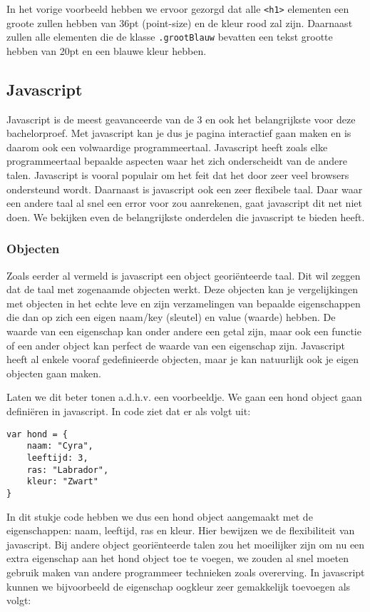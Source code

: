 In het vorige voorbeeld hebben we ervoor gezorgd dat alle \lstinline[basicstyle=\ttfamily\color{red}]|<h1>| elementen een groote zullen hebben van 36pt (point-size) en de kleur rood zal zijn. Daarnaast zullen alle elementen die de klasse \lstinline[basicstyle=\ttfamily\color{red}]|.grootBlauw| bevatten een tekst grootte hebben van 20pt en een blauwe kleur hebben.

\subsection{Javascript}
\label{subsec:Web VR}
Javascript is de meest geavanceerde van de 3 en ook het belangrijkste voor deze bachelorproef. Met javascript kan je dus je pagina interactief gaan maken en is daarom ook een volwaardige programmeertaal. Javascript heeft zoals elke programmeertaal bepaalde aspecten waar het zich onderscheidt van de andere talen. Javascript is vooral populair om het feit dat het door zeer veel browsers ondersteund wordt. Daarnaast is javascript ook een zeer flexibele taal. Daar waar een andere taal al snel een error voor zou aanrekenen, gaat javascript dit net niet doen. We bekijken even de belangrijkste onderdelen die javascript te bieden heeft.

\subsubsection{Objecten}
\label{sssec:objecten}
Zoals eerder al vermeld is javascript een object georiënteerde taal. Dit wil zeggen dat de taal met zogenaamde objecten werkt. Deze objecten kan je vergelijkingen met objecten in het echte leve en zijn verzamelingen van bepaalde eigenschappen die dan op zich een eigen naam/key (sleutel) en value (waarde) hebben. De waarde van een eigenschap kan onder andere een getal zijn, maar ook een functie of een ander object kan perfect de waarde van een eigenschap zijn. Javascript heeft al enkele vooraf gedefinieerde objecten, maar je kan natuurlijk ook je eigen objecten gaan maken.

Laten we dit beter tonen a.d.h.v. een voorbeeldje. We gaan een hond object gaan definiëren in javascript. In code ziet dat er als volgt uit:

\begin{lstlisting}[frame=single, caption=Hond object aanmaken]
var hond = {
	naam: "Cyra",
	leeftijd: 3,
	ras: "Labrador",
	kleur: "Zwart"
}
\end{lstlisting}

In dit stukje code hebben we dus een hond object aangemaakt met de eigenschappen: naam, leeftijd, ras en kleur. Hier bewijzen we de flexibiliteit van javascript. Bij andere object georiënteerde talen zou het moeilijker zijn om nu een extra eigenschap aan het hond object toe te voegen, we zouden al snel moeten gebruik maken van andere programmeer technieken zoals overerving. In javascript kunnen we bijvoorbeeld de eigenschap oogkleur zeer gemakkelijk toevoegen als volgt:

